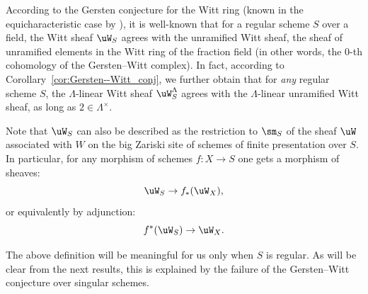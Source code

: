 \begin{rem}\label{rem:terminology_unramified_Witt}
According to the Gersten conjecture for the Witt ring
(known in the equicharacteristic case by \cite{BalmerGillePaninWalter}),
it is well-known that for a regular scheme $S$ over a field,
the Witt sheaf $\uW_S$ agrees with the unramified Witt sheaf, \ie the sheaf of unramified elements in the Witt ring of the fraction field (in other words, the $0$-th cohomology of the Gersten--Witt complex).
In fact, according to Corollary~\ref{cor:Gersten--Witt_conj},
we further obtain that for \emph{any} regular scheme $S$,
the $\Lambda$-linear Witt sheaf $\uW_S^\Lambda$ agrees with the $\Lambda$-linear unramified Witt sheaf, as long as $2\in \Lambda^\times$.
\end{rem}

\begin{rem}
Note that $\uW_S$ can also be described as the restriction to $\sm_S$ of the sheaf $\uW$ associated with $W$ on the big Zariski site of schemes of finite presentation over $S$.
In particular, for any morphism of schemes $f:X \to S$ one gets a morphism of sheaves:
\begin{equation}\label{eq:funct1_uW}
\uW_S \to f_*(\uW_X),
\end{equation}
or equivalently by adjunction:
\begin{equation}\label{eq:funct2_uW}
f^*(\uW_S) \to \uW_X.
\end{equation}
\end{rem}

\begin{rem}\label{rem:W_S singular}
The above definition will be meaningful for us only when $S$ is regular.
As will be clear from the next results, this is explained by the failure of the Gersten--Witt conjecture over singular schemes.
\end{rem}

